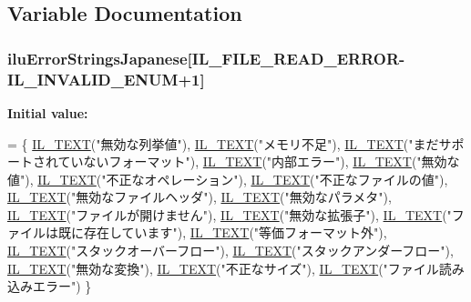 \subsection{Variable Documentation}
\hypertarget{ilu__err-japanese_8h_ae8129baae6553dc73a8a6c6ad9f3c0d2}{
\subsubsection[{ilu\-Error\-Strings\-Japanese}]{ ilu\-Error\-Strings\-Japanese\mbox{[}{\bf I\-L\-\_\-\-F\-I\-L\-E\-\_\-\-R\-E\-A\-D\-\_\-\-E\-R\-R\-O\-R}-\/{\bf I\-L\-\_\-\-I\-N\-V\-A\-L\-I\-D\-\_\-\-E\-N\-U\-M}+1\mbox{]}}}\label{ilu__err-japanese_8h_ae8129baae6553dc73a8a6c6ad9f3c0d2}
{\bfseries Initial value\-:}
\begin{DoxyCode}
= \{
    \hyperlink{il_8h_a2907c2129d2ba2ebbae6aa6a69b7f685}{IL\_TEXT}(\textcolor{stringliteral}{"無効な列挙値"}), 
    \hyperlink{il_8h_a2907c2129d2ba2ebbae6aa6a69b7f685}{IL\_TEXT}(\textcolor{stringliteral}{"メモリ不足"}), 
    \hyperlink{il_8h_a2907c2129d2ba2ebbae6aa6a69b7f685}{IL\_TEXT}(\textcolor{stringliteral}{"まだサポートされていないフォーマット"}), 
    \hyperlink{il_8h_a2907c2129d2ba2ebbae6aa6a69b7f685}{IL\_TEXT}(\textcolor{stringliteral}{"内部エラー"}), 
    \hyperlink{il_8h_a2907c2129d2ba2ebbae6aa6a69b7f685}{IL\_TEXT}(\textcolor{stringliteral}{"無効な値"}), 
    \hyperlink{il_8h_a2907c2129d2ba2ebbae6aa6a69b7f685}{IL\_TEXT}(\textcolor{stringliteral}{"不正なオペレーション"}), 
    \hyperlink{il_8h_a2907c2129d2ba2ebbae6aa6a69b7f685}{IL\_TEXT}(\textcolor{stringliteral}{"不正なファイルの値"}), 
    \hyperlink{il_8h_a2907c2129d2ba2ebbae6aa6a69b7f685}{IL\_TEXT}(\textcolor{stringliteral}{"無効なファイルヘッダ"}), 
    \hyperlink{il_8h_a2907c2129d2ba2ebbae6aa6a69b7f685}{IL\_TEXT}(\textcolor{stringliteral}{"無効なパラメタ"}), 
    \hyperlink{il_8h_a2907c2129d2ba2ebbae6aa6a69b7f685}{IL\_TEXT}(\textcolor{stringliteral}{"ファイルが開けません"}), 
    \hyperlink{il_8h_a2907c2129d2ba2ebbae6aa6a69b7f685}{IL\_TEXT}(\textcolor{stringliteral}{"無効な拡張子"}), 
    \hyperlink{il_8h_a2907c2129d2ba2ebbae6aa6a69b7f685}{IL\_TEXT}(\textcolor{stringliteral}{"ファイルは既に存在しています"}), 
    \hyperlink{il_8h_a2907c2129d2ba2ebbae6aa6a69b7f685}{IL\_TEXT}(\textcolor{stringliteral}{"等価フォーマット外"}), 
    \hyperlink{il_8h_a2907c2129d2ba2ebbae6aa6a69b7f685}{IL\_TEXT}(\textcolor{stringliteral}{"スタックオーバーフロー"}), 
    \hyperlink{il_8h_a2907c2129d2ba2ebbae6aa6a69b7f685}{IL\_TEXT}(\textcolor{stringliteral}{"スタックアンダーフロー"}), 
    \hyperlink{il_8h_a2907c2129d2ba2ebbae6aa6a69b7f685}{IL\_TEXT}(\textcolor{stringliteral}{"無効な変換"}), 
    \hyperlink{il_8h_a2907c2129d2ba2ebbae6aa6a69b7f685}{IL\_TEXT}(\textcolor{stringliteral}{"不正なサイズ"}), 
    \hyperlink{il_8h_a2907c2129d2ba2ebbae6aa6a69b7f685}{IL\_TEXT}(\textcolor{stringliteral}{"ファイル読み込みエラー"}) 
\}
\end{DoxyCode}

